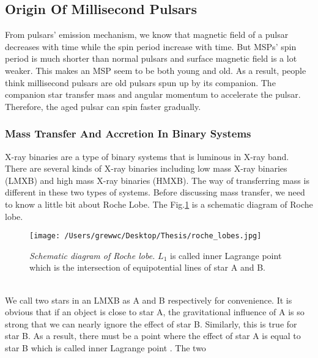 \documentclass[12pt]{report}
\begin{document}
        \subsection{Origin Of Millisecond Pulsars}
            From pulsars' emission mechanism, we know that magnetic field of a pulsar decreases with time while 
            the spin period increase with time. But MSPs' spin period is much shorter than normal pulsars and 
            surface magnetic field is a lot weaker. This makes an MSP seem to be both young and old. As a result,
            people think millisecond pulsars are old pulsars spun up by its companion. The companion star transfer
            mass and angular momentum to accelerate the pulsar. Therefore, the aged pulsar can spin faster 
            gradually. 
            \subsubsection{Mass Transfer And Accretion In Binary Systems}
                X-ray binaries are a type of binary systems that is luminous in X-ray band. There are several kinds 
                of X-ray binaries including low mass X-ray binaries (LMXB) and high mass X-ray binaries (HMXB). 
                The way of transferring mass is different in these two types of systems. Before discussing mass 
                transfer, we need to know a little bit about Roche Lobe. The Fig.\ref{fig:roche lobe} is a 
                schematic diagram of Roche lobe.
                \begin{figure}[h]
                  \centering
                  \texttt{[image: /Users/grewwc/Desktop/Thesis/roche\_lobes.jpg]}
                  \caption{\footnotesize \textit{Schematic diagram of Roche lobe.} $L_{1}$ is called inner 
                            Lagrange point which is the intersection of equipotential lines of star A 
                            and B.}
                  \label{fig:roche lobe}
                \end{figure}\\
                \indent  We call two stars in an LMXB as A and B respectively for convenience. It is obvious 
                that if an object is close to star A, the gravitational influence of A is so strong that we can 
                nearly ignore the effect of star B. Similarly, this is true for star B. As a result, there must be 
                a point where the effect of star A is equal to star B which is called inner Lagrange point 
                \cite{0004-637X-603-1-283}. The two
\end{document}
